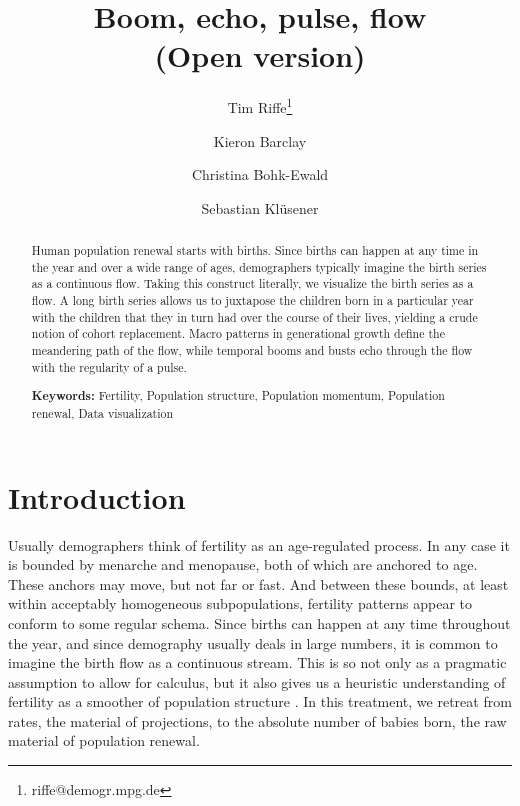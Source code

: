 \documentclass{article}
\begin{document}
\title{Boom, echo, pulse, flow\\ \small (Open version)}
\author[1]{Tim Riffe\thanks{riffe@demogr.mpg.de}}
\author[1]{Kieron Barclay}
\author[1]{Christina Bohk-Ewald}
\author[2]{Sebastian Kl\"usener}
\maketitle

\begin{abstract}
Human population renewal starts with births. Since births can happen at any
time in the year and over a wide range of ages, demographers typically imagine
the birth series as a continuous flow. Taking this construct literally, we
visualize the birth series as a flow. A long birth series allows us to
juxtapose the children born in a particular year with the children that
they in turn had over the course of their lives, yielding a crude notion of
cohort replacement. Macro patterns in generational growth define the meandering
path of the flow, while temporal booms and busts echo through the flow with the
regularity of a pulse.
\vspace{1em}

{\bf Keywords:} Fertility, Population structure, Population momentum, Population renewal, Data visualization
\end{abstract}

\onehalfspacing
\section{Introduction}
Usually demographers think of fertility as an age-regulated process. In any case it is
bounded by menarche and menopause, both of which are anchored to age. These anchors may
move, but not far or fast. And between these bounds, at least within acceptably homogeneous subpopulations, fertility patterns appear to conform to some regular schema. Since births can happen at any time throughout the year, and since demography usually deals in large numbers, it is common to imagine the birth flow as a continuous stream. This is so not only as a pragmatic assumption to allow for calculus, but it also gives us a heuristic understanding of fertility as a smoother of population structure \citep{arthur1982ergodic}. In this treatment, we retreat from rates, the material of projections, to the absolute number of babies born, the raw material of population renewal. 
\end{document}
